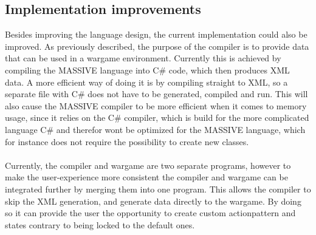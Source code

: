 \subsection{Implementation improvements}
Besides improving the language design, the current implementation could also be improved. As previously described, the purpose of the compiler is to provide data that can be used in a wargame environment.
Currently this is achieved by compiling the MASSIVE language into C\# code, which then produces XML data. 
A more efficient way of doing it is by compiling straight to XML, so a separate file with C\# does not have to be generated, compiled and run. 
This will also cause the MASSIVE compiler to be more efficient when it comes to memory usage, since it relies on the C\# compiler, which is build for the more complicated language C\# and therefor wont be optimized for the MASSIVE language, which for instance does not require the possibility to create new classes.\\
 \\
Currently, the compiler and wargame are two separate programs, however to make the user-experience more consistent the compiler and wargame can be integrated further by merging them into one program.
This allows the compiler to skip the XML generation, and generate data directly to the wargame. By doing so it can provide the user the opportunity to create custom actionpattern and states contrary to being locked to the default ones.\newline
 \\
